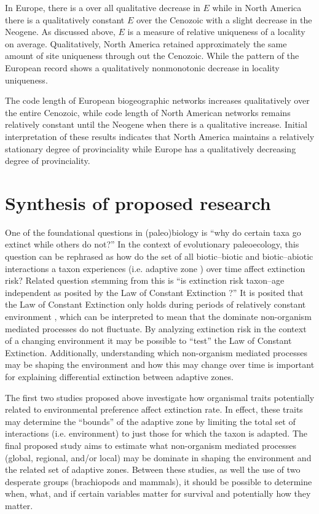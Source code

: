 \documentclass[12pt,letterpaper]{article}
\begin{document}
In Europe, there is a over all qualitative decrease in \(E\) while in North America there is a qualitatively constant \(E\) over the Cenozoic with a slight decrease in the Neogene. As discussed above, \(E\) is a measure of relative uniqueness of a locality on average. Qualitatively, North America retained approximately the same amount of site uniqueness through out the Cenozoic. While the pattern of the European record shows a qualitatively nonmonotonic decrease in locality uniqueness.

The code length of European biogeographic networks increases qualitatively over the entire Cenozoic, while code length of North American networks remains relatively constant until the Neogene when there is a qualitative increase. Initial interpretation of these results indicates that North America maintains a relatively stationary degree of provinciality while Europe has a qualitatively decreasing degree of provinciality. 


\section{Synthesis of proposed research}
One of the foundational questions in (paleo)biology is ``why do certain taxa go extinct while others do not?'' In the context of evolutionary paleoecology, this question can be rephrased as how do the set of all biotic--biotic and biotic--abiotic interactions a taxon experiences (i.e. adaptive zone \citealp{Simpson1944}) over time affect extinction risk? Related question stemming from this is ``is extinction risk taxon--age independent as posited by the Law of Constant Extinction \citep{VanValen1973}?'' It is posited that the Law of Constant Extinction only holds during periods of relatively constant environment \citep{Liow2007b,VanValen1973}, which can be interpreted to mean that the dominate non-organism mediated processes do not fluctuate. By analyzing extinction risk in the context of a changing environment it may be possible to ``test'' the Law of Constant Extinction. Additionally, understanding which non-organism mediated processes may be shaping the environment and how this may change over time is important for explaining differential extinction between adaptive zones. 

The first two studies proposed above investigate how organismal traits potentially related to environmental preference affect extinction rate. In effect, these traits may determine the ``bounds'' of the adaptive zone by limiting the total set of interactions (i.e. environment) to just those for which the taxon is adapted. The final proposed study aims to estimate what non-organism mediated processes (global, regional, and/or local) may be dominate in shaping the environment and the related set of adaptive zones. Between these studies, as well the use of two desperate groups (brachiopods and mammals), it should be possible to determine when, what, and if certain variables matter for survival and potentially how they matter. 
\end{document}
